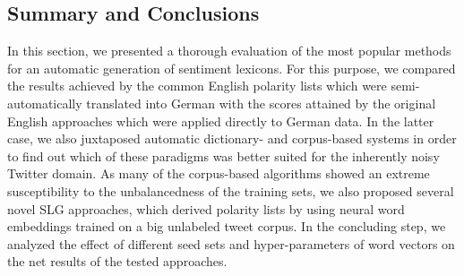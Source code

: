 
\subsection{Summary and Conclusions}

In this section, we presented a thorough evaluation of the most
popular methods for an automatic generation of sentiment lexicons.
For this purpose, we compared the results achieved by the common
English polarity lists which were semi-automatically translated into
German with the scores attained by the original English approaches
which were applied directly to German data.  In the latter case, we
also juxtaposed automatic dictionary- and corpus-based systems in
order to find out which of these paradigms was better suited for the
inherently noisy Twitter domain.  As many of the corpus-based
algorithms showed an extreme susceptibility to the unbalancedness of
the training sets, we also proposed several novel SLG approaches,
which derived polarity lists by using neural word embeddings trained
on a big unlabeled tweet corpus.  In the concluding step, we analyzed
the effect of different seed sets and hyper-parameters of word vectors
on the net results of the tested approaches.

